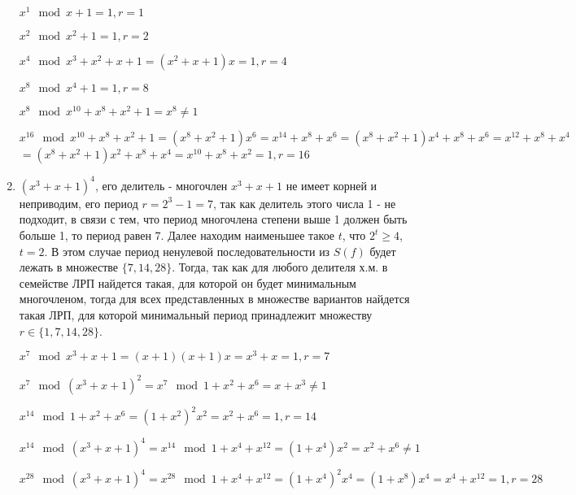 \documentclass[utf8x, 14pt]{G7-32} %
\begin{document}
\begin{enumerate}
    $x^1 \mod x+1 = 1, r = 1$
    
    $x^2 \mod x^2+1 = 1, r = 2$
    
    $x^4 \mod x^3 + x^2 + x +1 = (x^2 + x + 1) x = 1, r = 4$
    
    $x^8 \mod x^4+1 = 1, r = 8$
    
    $x^8 \mod x^{10} +x^8 + x^2 + 1 = x^8 \neq 1$
    
    $x^{16} \mod x^{10} +x^8 + x^2 + 1  = (x^8 + x^2 + 1) x^6 = x^{14} + x^8 + x^6 = (x^8 + x^2 + 1) x^4 + x^8 + x^6 = x^{12} + x^8 + x^4$
    $ = (x^8 + x^2 + 1) x^2 + x^8 + x^4 = x^{10} + x^8 + x^2 = 1, r = 16$
    
    \item $(x^3+x+1)^4$, его делитель - многочлен $x^3+x+1$ не имеет корней и неприводим, его период $r = 2^3 -1 = 7$, так как делитель этого числа 1 - не подходит, в связи с тем, что период многочлена степени выше 1 должен быть больше 1, то период равен $7$. Далее находим наименьшее такое $t$, что $2^t \geq 4$, $t=2$. В этом случае период ненулевой последовательности из $S(f)$ будет лежать в множестве $\{7, 14, 28\}$. Тогда, так как для любого делителя х.м. в семействе ЛРП найдется такая, для которой он будет минимальным многочленом, тогда для всех представленных в множестве вариантов найдется такая ЛРП, для которой минимальный период принадлежит множеству $r \in \{1, 7, 14, 28 \}$.
    
    $x^7 \mod x^3+x+1 = (x+1)(x+1)x = x^3 + x = 1, r = 7$
    
    $x^7 \mod (x^3+x+1)^2 = x^7 \mod 1+x^2+x^6 = x+x^3 \neq 1$
    
    $x^{14} \mod 1+x^2+x^6 = (1+x^2)^2 x^2 = x^2 + x^6 = 1, r = 14$
    
    $x^{14} \mod (x^3+x+1)^4 = x^{14} \mod 1 + x^4 + x^{12} = (1+x^4) x^2 = x^2 + x^6 \neq 1$
    
    $x^{28} \mod (x^3+x+1)^4 = x^{28} \mod 1 + x^4 + x^{12} = (1+x^4)^2 x^4 = (1 + x^8) x^4 = x^4 + x^{12} = 1, r = 28$
    

\end{enumerate}
\end{document}

